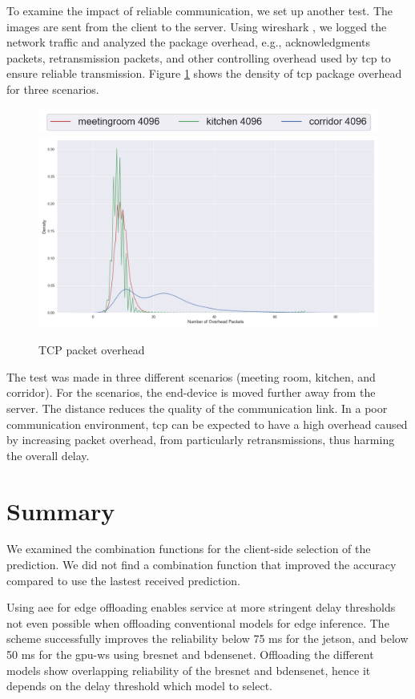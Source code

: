 To examine the impact of reliable communication, we set up another test. The images are sent from the client to the server. Using \gls{wireshark} \cite{noauthor_wireshark_nodate}, we logged the network traffic and analyzed the package overhead, e.g., acknowledgments packets, retransmission packets, and other controlling overhead used by \gls{tcp} to ensure reliable transmission. Figure \ref{fig:tcp-overhead} shows the density of \gls{tcp} package overhead for three scenarios. 
\begin{figure}
	\centering
	\includegraphics[width=.5\linewidth]{figures/tcp/density_legend}
	\includegraphics[width=.8\linewidth]{figures/tcp/density}
	\caption[TCP retransmission overhead]{TCP packet overhead}
	\label{fig:tcp-overhead}
\end{figure}
The test was made in three different scenarios (meeting room, kitchen, and corridor). For the scenarios, the end-device is moved further away from the server. The distance reduces the quality of the communication link. In a poor communication environment, \gls{tcp} can be expected to have a high overhead caused by increasing packet overhead, from particularly retransmissions, thus harming the overall delay.  

\section{Summary} \label{sec:edge-summary}

We examined the combination functions for the client-side selection of the prediction. We did not find a combination function that improved the accuracy compared to use the lastest received prediction. 

Using \gls{aee} for edge offloading enables service at more stringent delay thresholds not even possible when offloading conventional models for edge inference. The scheme successfully improves the reliability below 75 ms for the \gls{jetson}, and below 50 ms for the \gls{gpu-ws} using \gls{bresnet} and \gls{bdensenet}. Offloading the different models show overlapping reliability of the \gls{bresnet} and \gls{bdensenet}, hence it depends on the delay threshold which model to select.

